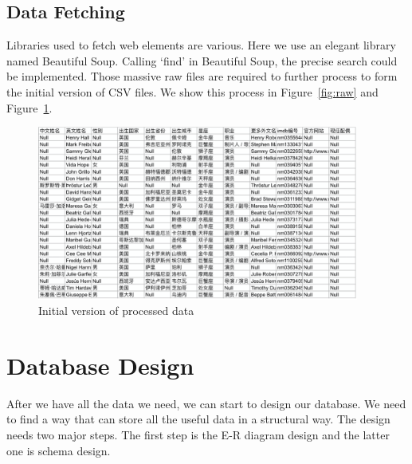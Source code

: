 \documentclass[a4paper]{article}
\begin{document}
  \subsection{Data Fetching}
Libraries used to fetch web elements are various. Here we use an elegant library named Beautiful Soup. Calling ‘find’ in Beautiful Soup, the precise search could be implemented. Those massive raw files are required to further process to form the initial version of CSV files. We show this process in Figure~\ref{fig:raw} and Figure~\ref{fig:initial_process}.
  \begin{figure}[H]
    \centering
    \includegraphics[width=300pt]{figures/processed_data.png}
    \caption{Initial version of processed data}
    \label{fig:initial_process}
  \end{figure}

\section{Database Design}
After we have all the data we need, we can start to design our database. We need to find a way that can store all the useful data in a structural way. The design needs two major steps. The first step is the E-R diagram design and the latter one is schema design.
\end{document}
